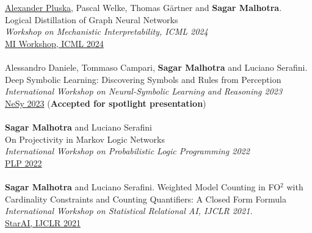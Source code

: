\documentclass[10pt, a4paper]{article}
\newcommand{\years}[1]{\marginnote{\scriptsize #1}}
\begin{document}
\years{2024}\underline{Alexander Pluska}, Pascal Welke, Thomas G{\"a}rtner and \textbf{Sagar Malhotra}.\\
Logical Distillation of Graph Neural Networks\\
\emph{Workshop on Mechanistic Interpretability, ICML 2024}\\
\href{https://openreview.net/forum?id=TfYnD2gYRO}{MI Workshop, ICML 2024}\\ \\
\years{2023}Alessandro Daniele, Tommaso Campari, \textbf{Sagar Malhotra} and Luciano Serafini. \\ Deep Symbolic Learning: Discovering Symbols and Rules from Perception \\  
\emph{International Workshop on Neural-Symbolic Learning and Reasoning 2023}\\
\href{https://sites.google.com/view/nesy2023/home/nesy2023-programme-outline?authuser=0}{NeSy 2023} (\textbf{Accepted for spotlight presentation})\\ \\
\years{2022}\textbf{Sagar Malhotra} and Luciano Serafini\\
On Projectivity in Markov Logic Networks\\ 
\emph{International Workshop on Probabilistic Logic Programming 2022}\\ \href{https://easychair.org/publications/preprint/2lTk}{ PLP 2022}\\ \\
\years{2021}\textbf{Sagar Malhotra} and Luciano Serafini. Weighted Model Counting in FO$^2$ with Cardinality Constraints and Counting Quantifiers: A Closed Form Formula\\ \emph{International Workshop on Statistical Relational AI, IJCLR 2021. }\\
\href{https://starai.cs.kuleuven.be/2021/}{ StarAI, IJCLR 2021}  
\end{document}
